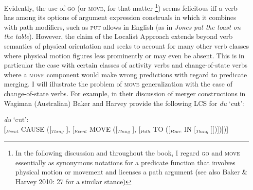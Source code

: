 Evidently, the use of \textsc{go} (or \textsc{move}, for that matter
\footnote{In the following discussion and throughout the book, I regard \textsc{go} and \textsc{move} essentially as synonymous notations for a predicate function that involves physical motion or movement and licenses a path argument (see also Baker \& Harvey 2010: 27 for a similar stance)}) seems felicitous iff a verb has among its options of argument expression construals in which it combines with path modifiers, such as \textsc{put} allows in English (as in \textit{Jones put the toast on the table}). However, the claim of the Localist Approach extends beyond verb semantics of physical orientation and seeks to account for many other verb classes where physical motion figures less prominently or may even be absent. This is in particular the case with certain classes of activity verbs and change-of-state verbs where a \textsc{move} component would make wrong predictions with regard to predicate merging. I will illustrate the problem of \textsc{move} generalization with the case of change-of-state verbs. For example, in their discussion of merger constructions in Wagiman (Australian) Baker and Harvey provide the following LCS for \textit{du} `cut':

\ea \label{Wagiman01}
\textit{du} `cut': \\
{\small[$_{Event}$ CAUSE ([$_{Thing}$ ], [$_{Event}$ MOVE ([$_{Thing}$ ], 
[$_{Path}$ TO ([$_{Place}$ IN [$_{Thing}$ ]])])])]}
\z

